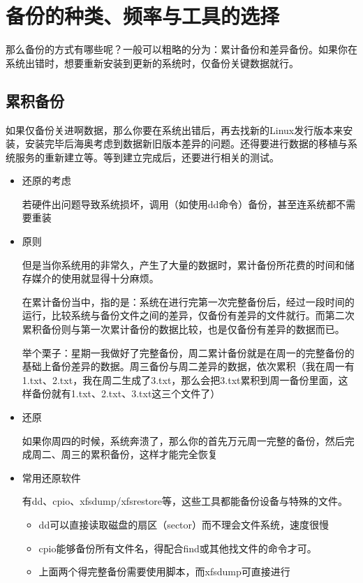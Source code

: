 \documentclass[
]{book}
\providecommand{\tightlist}{%
  \setlength{\itemsep}{0pt}\setlength{\parskip}{0pt}}
\begin{document}
\hypertarget{ux5907ux4efdux7684ux79cdux7c7bux9891ux7387ux4e0eux5de5ux5177ux7684ux9009ux62e9}{%
\section{备份的种类、频率与工具的选择}\label{ux5907ux4efdux7684ux79cdux7c7bux9891ux7387ux4e0eux5de5ux5177ux7684ux9009ux62e9}}

那么备份的方式有哪些呢？一般可以粗略的分为：累计备份和差异备份。如果你在系统出错时，想要重新安装到更新的系统时，仅备份关键数据就行。

\hypertarget{ux7d2fux79efux5907ux4efd}{%
\subsection{累积备份}\label{ux7d2fux79efux5907ux4efd}}

如果仅备份关进啊数据，那么你要在系统出错后，再去找新的Linux发行版本来安装，安装完毕后海奥考虑到数据新旧版本差异的问题。还得要进行数据的移植与系统服务的重新建立等。等到建立完成后，还要进行相关的测试。

\begin{itemize}
\item
  还原的考虑

  若硬件出问题导致系统损坏，调用（如使用dd命令）备份，甚至连系统都不需要重装
\item
  原则

  但是当你系统用的非常久，产生了大量的数据时，累计备份所花费的时间和储存媒介的使用就显得十分麻烦。

  在累计备份当中，指的是：系统在进行完第一次完整备份后，经过一段时间的运行，比较系统与备份文件之间的差异，仅备份有差异的文件就行。而第二次累积备份则与第一次累计备份的数据比较，也是仅备份有差异的数据而已。

  举个栗子：星期一我做好了完整备份，周二累计备份就是在周一的完整备份的基础上备份差异的数据。周三备份与周二差异的数据，依次累积（我在周一有1.txt、2.txt，我在周二生成了3.txt，那么会把3.txt累积到周一备份里面，这样备份就有1.txt、2.txt、3.txt这三个文件了）
\item
  还原

  如果你周四的时候，系统奔溃了，那么你的首先万元周一完整的备份，然后完成周二、周三的累积备份，这样才能完全恢复
\item
  常用还原软件

  有dd、cpio、xfsdump/xfsrestore等，这些工具都能备份设备与特殊的文件。

  \begin{itemize}
  \tightlist
  \item
    dd可以直接读取磁盘的扇区（sector）而不理会文件系统，速度很慢
  \item
    cpio能够备份所有文件名，得配合find或其他找文件的命令才可。
  \item
    上面两个得完整备份需要使用脚本，而xfsdump可直接进行
  \end{itemize}
\end{itemize}
\end{document}
